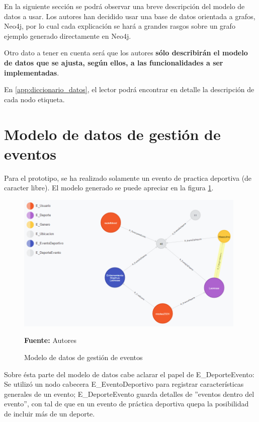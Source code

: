 En la siguiente sección se podrá observar una breve descripción del modelo de datos a usar. Los autores han decidido usar una base de datos orientada a grafos, Neo4j, por lo cual cada explicación se hará a grandes rasgos sobre un grafo ejemplo generado directamente en Neo4j.

Otro dato a tener en cuenta será que los autores \textbf{sólo describirán el modelo de datos que se ajusta, según ellos, a las funcionalidades a ser implementadas}.

En \ref{app:diccionario_datos}, el lector podrá encontrar en detalle la descripción de cada nodo etiqueta.

\section{Modelo de datos de gestión de eventos}

Para el prototipo, se ha realizado solamente un evento de practica deportiva (de caracter libre). El modelo generado se puede apreciar en la figura \ref{fig:modelo_datos_gestion_eventos}.

\begin{figure}[!htb]
  \begin{center}
    \includegraphics[width=11cm]{./imagenes/Modelo_de_datos/Gestion_eventos.png}
    \caption{Modelo de datos de gestión de eventos}
    \label{fig:modelo_datos_gestion_eventos}
    \textbf{Fuente:}  Autores
  \end{center}
\end{figure}

Sobre ésta parte del modelo de datos cabe aclarar el papel de E\_DeporteEvento: Se utilizó un nodo cabecera E\_EventoDeportivo para registrar características generales de un evento; E\_DeporteEvento guarda detalles de ''eventos dentro del evento'', con tal de que en un evento de práctica deportiva quepa la posibilidad de incluir más de un deporte.

